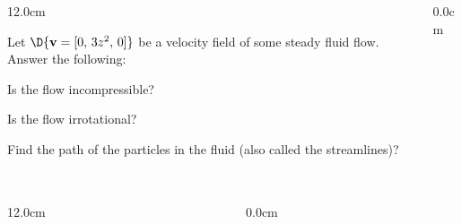 \begin{frame}
\frametitle{}
\scriptsize
\begin{columns}
\begin{column}{12.0cm}

\EX Let $\D{{\bf v} = [0,\, 3z^2,\, 0]}$ be a velocity field of some steady fluid flow.  Answer the following:

\vspace{0.1cm} 

\OBUL Is the flow incompressible?

\vspace{0.1cm}

\OBUL Is the flow irrotational?

\vspace{0.1cm}

\OBUL Find the path of the particles in the fluid (also called the streamlines)?

\vspace{0.2cm}

\SOL

\vspace{7.2cm}

\end{column}
\begin{column}{0.0cm}\end{column}
\end{columns}
\end{frame}

\begin{frame}
\frametitle{}
\scriptsize
\begin{columns}
\begin{column}{12.0cm}
	
\end{column}
\begin{column}{0.0cm}\end{column}
\end{columns}
\end{frame}

